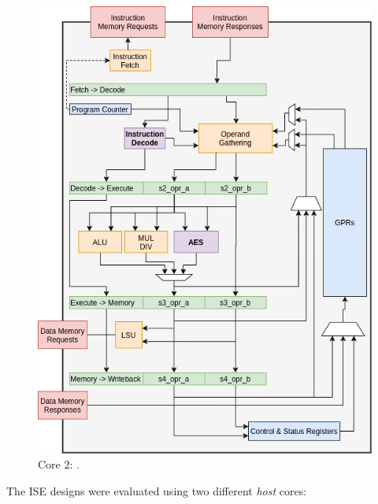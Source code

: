 
\begin{figure}
\centering
\includegraphics[scale=0.45,angle=90]{diagrams/scarv-cpu-uarch.png}
\caption{Core $2$: .}
\label{fig:design:cpu_block:2}
\end{figure}


The ISE designs were evaluated using two different {\em host} cores:

